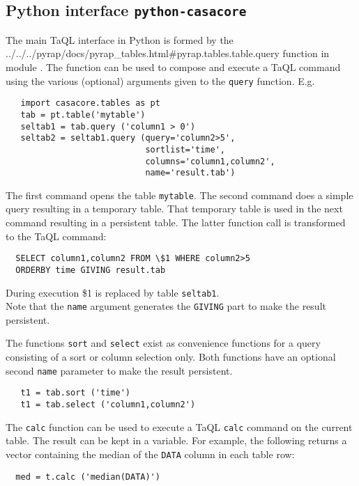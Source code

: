 \subsection{Python interface \texttt{python-casacore}}
  The main TaQL interface in Python is formed by the
  {../../../pyrap/docs/pyrap_tables.html\#pyrap.tables.table.query} function in module
  .
  The function can be used
  to compose and execute a TaQL command using the various (optional)
  arguments given to the \texttt{query} function. E.g.
\begin{verbatim}
   import casacore.tables as pt
   tab = pt.table('mytable')
   seltab1 = tab.query ('column1 > 0')
   seltab2 = seltab1.query (query='column2>5',
                            sortlist='time',
                            columns='column1,column2',
                            name='result.tab')
\end{verbatim}
  The first command opens the table \texttt{mytable}.
  The second command does a simple query resulting in a temporary
  table. That temporary table is used in the next command resulting in
  a persistent table. The latter function call is transformed to
  the TaQL command:
\begin{verbatim}
  SELECT column1,column2 FROM \$1 WHERE column2>5
  ORDERBY time GIVING result.tab
\end{verbatim}
  During execution \$1 is replaced by table \texttt{seltab1}.
  \\Note that the \texttt{name} argument
  generates the \texttt{GIVING} part to make the result persistent.

  The functions \texttt{sort} and \texttt{select} exist as convenience
  functions for a query consisting of a sort or  column selection
  only. Both functions have an optional second \texttt{name} parameter
  to make the result persistent.
\begin{verbatim}
   t1 = tab.sort ('time')
   t1 = tab.select ('column1,column2')
\end{verbatim}

  The \texttt{calc} function can be used to execute a TaQL
  \texttt{calc} command on the current table. The result can be kept
  in a variable. For example, the following returns a vector containing
  the median of the \texttt{DATA} column in each table row:
\begin{verbatim}
  med = t.calc ('median(DATA)')
\end{verbatim}


